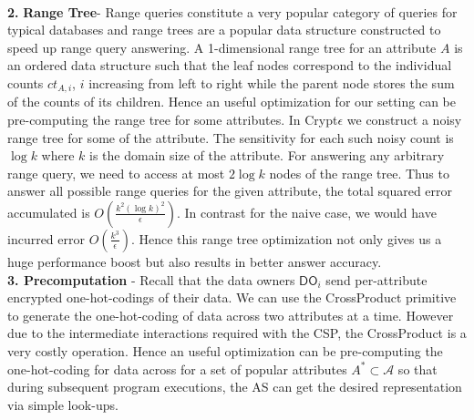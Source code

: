  \\
\textbf{2. } \textbf{Range Tree}- Range queries constitute a very popular category of queries for typical databases and range trees are a popular data structure constructed to speed up range query answering. A 1-dimensional range tree for an attribute $A$ is an ordered data structure such that the leaf nodes correspond to the individual counts $ct_{A,i}$, $i$ increasing from left to right while the parent node stores the sum of the counts of its children. Hence an useful optimization for our setting can be pre-computing the range tree for some attributes. In Crypt$\epsilon$ we construct a noisy range tree for some of the attribute. The sensitivity for each such noisy count is $\log k$ where $k$ is the domain size of the attribute. For answering any arbitrary range query, we need to access at most $2\log k$ nodes of the range tree. Thus to answer all possible range queries for the given attribute, the total squared error accumulated is $O(\frac{k^2(\log k)^2 }{\epsilon})$. In contrast for the naive case, we would have incurred error $O(\frac{k^3}{\epsilon})$. Hence this range tree optimization not only gives us a huge performance boost but also results in better answer accuracy. \\
\textbf{3. Precomputation} - Recall that the data owners $\textsf{DO}_i$ send per-attribute encrypted one-hot-codings of their data. We can use the \textsf{CrossProduct} primitive to generate the one-hot-coding of data across two attributes at a time. However due to the intermediate interactions required with the \textsf{CSP}, the \textsf{CrossProduct} is a very costly operation. Hence an  useful optimization can be pre-computing the one-hot-coding for data across for a set of popular attributes $A^* \subset \mathcal{A}$ so that during subsequent program executions, the \textsf{AS} can get the desired representation via simple look-ups. 
